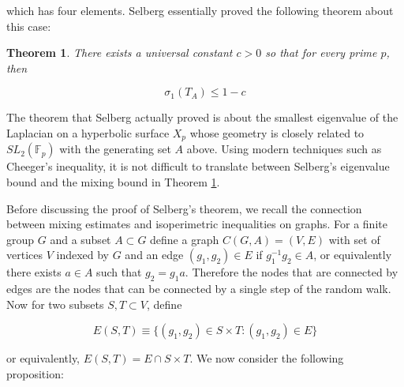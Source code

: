 \documentclass[12pt]{amsart}
\newtheorem{theorem}{Theorem}[section]
\newcommand{\FF}{\mathbb{F}}
\begin{document}
which has four elements. Selberg essentially proved the following theorem about this case: 

\begin{theorem} \label{selberg}
There exists a universal constant $c > 0$ so that for every prime $p$, then 

\begin{equation}
    \sigma_1(T_A) \leq 1 - c 
\end{equation}
\end{theorem}

The theorem that Selberg actually proved is about the smallest eigenvalue of the Laplacian on a hyperbolic surface $X_p$ whose geometry is closely related to $SL_2(\FF_p)$ with the generating set $A$ above.   Using modern techniques such as Cheeger's inequality,  it is not difficult to translate between Selberg's eigenvalue bound and the mixing bound in Theorem \ref{selberg}.  

Before discussing the proof of Selberg's theorem,  we recall the connection between mixing estimates and isoperimetric inequalities on graphs.  
For a finite group $G$ and a subset $A \subset G$ define a graph $C(G,A) = (V, E)$ with set of vertices $V$ indexed by $G$ and an edge $(g_1, g_2) \in E$ if $g_1^{-1} g_2 \in A$, or equivalently there exists $a\in A$ such that $g_2 = g_1 a$. Therefore the nodes that are connected by edges are the nodes that can be connected by a single step of the random walk. Now for two subsets $S,T\subset V$, define 

\[ E(S, T) \equiv \{ (g_1, g_2) \in S \times T: (g_1, g_2) \in E\}\] 

or equivalently, $E(S,T) = E \cap S \times T$. We now consider the following proposition: 
\end{document}
